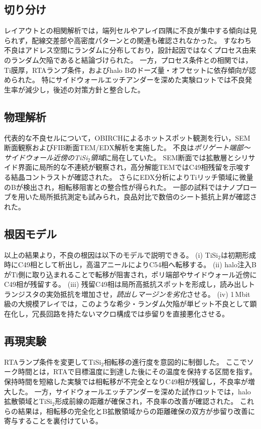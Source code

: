 \documentclass[conference]{IEEEtran}
\begin{document}
\subsection{切り分け}
レイアウトとの相関解析では，端列セルやアレイ四隅に不良が集中する傾向は見られず，配線交差部や高密度パターンとの関連も確認されなかった。  
すなわち不良はアドレス空間にランダムに分布しており，設計起因ではなくプロセス由来のランダム欠陥であると結論づけられた。  
一方，プロセス条件との相関では，Ti膜厚，RTAランプ条件，およびhalo Bのドーズ量・オフセットに依存傾向が認められた。  
特にサイドウォールエッチアンダーを深めた実験ロットでは不良発生率が減少し，後述の対策方針と整合した。

\subsection{物理解析}
代表的な不良セルについて，OBIRCHによるホットスポット観測を行い，SEM断面観察およびFIB断面TEM/EDX解析を実施した。  
不良は\emph{ポリゲート端部〜サイドウォール近傍のTiSi$_2$領域}に局在していた。  
SEM断面では拡散層とシリサイド界面に局所的な不連続が観察され，高分解能TEMではC49相残留を示唆する結晶コントラストが確認された。  
さらにEDX分析によりTiリッチ領域に微量のBが検出され，相転移阻害との整合性が得られた。  
一部の試料ではナノプローブを用いた局所抵抗測定も試みられ，良品対比で数倍のシート抵抗上昇が確認された。

\subsection{根因モデル}
以上の結果より，不良の根因は以下のモデルで説明できる。  
(i) TiSi$_2$は初期形成時にC49相として析出し，高温アニールによりC54相へ転移する。  
(ii) halo注入BがTi側に取り込まれることで転移が阻害され，ポリ端部やサイドウォール近傍にC49相が残留する。  
(iii) 残留C49相は局所高抵抗スポットを形成し，読み出しトランジスタの実効抵抗を増加させ，\emph{読出しマージンを劣化}させる。  
(iv) 1\,Mbit級の大規模アレイでは，このような希少・ランダム欠陥が単ビット不良として顕在化し，冗長回路を持たないマクロ構成では歩留りを直接悪化させる。

\subsection{再現実験}
RTAランプ条件を変更してTiSi$_2$相転移の進行度を意図的に制御した。  
ここでソーク時間とは，RTAで目標温度に到達した後にその温度を保持する区間を指す。  
保持時間を短縮した実験では相転移が不完全となりC49相が残留し，不良率が増大した。  
一方，サイドウォールエッチアンダーを深めた試作ロットでは，halo拡散領域とTiSi$_2$形成前線の距離が確保され，不良率の改善が確認された。  
これらの結果は，相転移の完全化とB拡散領域からの距離確保の双方が歩留り改善に寄与することを裏付けている。
\end{document}
